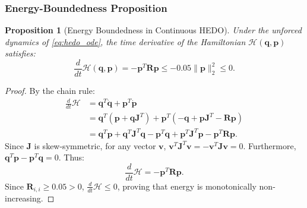 \documentclass[conference]{IEEEtran}
\newtheorem{proposition}{Proposition}
\begin{document}
\subsubsection{Energy-Boundedness Proposition}
\begin{proposition}[Energy Boundedness in Continuous HEDO]
Under the unforced dynamics of \eqref{eq:hedo_ode}, the time derivative of the Hamiltonian $\mathcal{H}(\mathbf{q}, \mathbf{p})$ satisfies:
\begin{equation}
\frac{d}{dt}\mathcal{H}(\mathbf{q}, \mathbf{p}) = -\mathbf{p}^T \mathbf{R} \mathbf{p} \le -0.05 \|\mathbf{p}\|_2^2 \le 0.
\end{equation}
\end{proposition}
\begin{proof}
By the chain rule:
\begin{align}
\frac{d}{dt}\mathcal{H} &= \mathbf{q}^T \dot{\mathbf{q}} + \mathbf{p}^T \dot{\mathbf{p}} \nonumber \\
&= \mathbf{q}^T (\mathbf{p} + \mathbf{q} \mathbf{J}^T) + \mathbf{p}^T (-\mathbf{q} + \mathbf{p} \mathbf{J}^T - \mathbf{R} \mathbf{p}) \nonumber \\
&= \mathbf{q}^T \mathbf{p} + \mathbf{q}^T \mathbf{J}^T \mathbf{q} - \mathbf{p}^T \mathbf{q} + \mathbf{p}^T \mathbf{J}^T \mathbf{p} - \mathbf{p}^T \mathbf{R} \mathbf{p}.
\end{align}
Since $\mathbf{J}$ is skew-symmetric, for any vector $\mathbf{v}$, $\mathbf{v}^T \mathbf{J}^T \mathbf{v} = -\mathbf{v}^T \mathbf{J} \mathbf{v} = 0$. Furthermore, $\mathbf{q}^T \mathbf{p} - \mathbf{p}^T \mathbf{q} = 0$. Thus:
\begin{equation}
\frac{d}{dt}\mathcal{H} = -\mathbf{p}^T \mathbf{R} \mathbf{p}.
\end{equation}
Since $\mathbf{R}_{i,i} \ge 0.05 > 0$, $\frac{d}{dt}\mathcal{H} \le 0$, proving that energy is monotonically non-increasing.
\end{proof}
\end{document}
